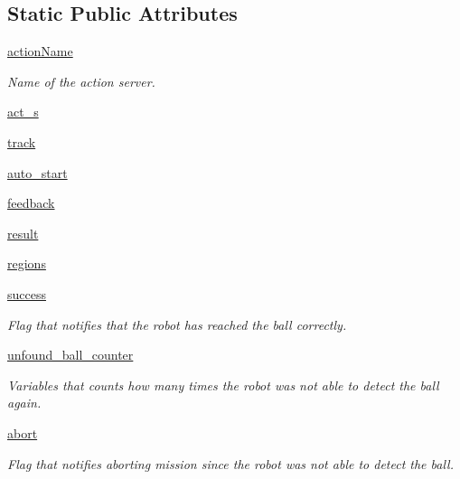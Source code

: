 \subsection*{Static Public Attributes}
\begin{DoxyCompactItemize}
\item 
\hyperlink{classtrackObj_1_1TrackAction_ad80530516be60157263ca1e57c59fed6}{action\+Name}
\begin{DoxyCompactList}\small\item\em Name of the action server. \end{DoxyCompactList}\item 
\hyperlink{classtrackObj_1_1TrackAction_aa5b8f1f6070c7e75cab3f943359d6001}{act\+\_\+s}
\item 
\hyperlink{classtrackObj_1_1TrackAction_a5541788941fcebbf14c41f71aad8613b}{track}
\item 
\hyperlink{classtrackObj_1_1TrackAction_addeb2999e3821d35af77f6ff1d7b5098}{auto\+\_\+start}
\item 
\hyperlink{classtrackObj_1_1TrackAction_ac2c204266bc7dbf8d974f78e1890f2b8}{feedback}
\item 
\hyperlink{classtrackObj_1_1TrackAction_a915456a6f6cd26f323c099e7df812737}{result}
\item 
\hyperlink{classtrackObj_1_1TrackAction_a62f0285030d63876460ef35d0ba7f97d}{regions}
\item 
\hyperlink{classtrackObj_1_1TrackAction_a9e4285f36d3025a6c23aea961daf6235}{success}
\begin{DoxyCompactList}\small\item\em Flag that notifies that the robot has reached the ball correctly. \end{DoxyCompactList}\item 
\hyperlink{classtrackObj_1_1TrackAction_afd86c34cad32d9ade931346be52cccf5}{unfound\+\_\+ball\+\_\+counter}
\begin{DoxyCompactList}\small\item\em Variables that counts how many times the robot was not able to detect the ball again. \end{DoxyCompactList}\item 
\hyperlink{classtrackObj_1_1TrackAction_ae862caff1721b4555cb9531f7b3db772}{abort}
\begin{DoxyCompactList}\small\item\em Flag that notifies aborting mission since the robot was not able to detect the ball. \end{DoxyCompactList}\item 

\end{DoxyCompactItemize}
